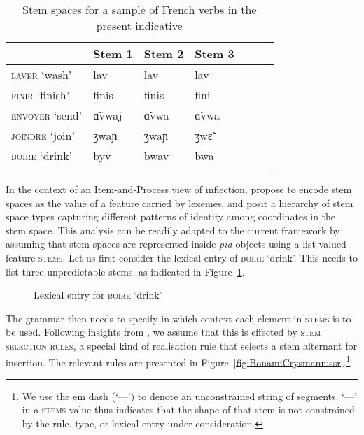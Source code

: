\documentclass[output=paper]{langsci/langscibook}
\begin{document}
\begin{table}[htb]

\begin{tabular}{lllllll}
\lsptoprule
& Stem 1 & Stem 2 & Stem 3\\
\midrule
\textsc{laver} `wash' & lav & lav & lav\\
\textsc{finir} `finish' & finis & finis & fini\\
\midrule
\textsc{envoyer} `send' & ɑ̃vwaj & ɑ̃vwa & ɑ̃vwa\\
\textsc{joindre} `join' & ʒwaɲ & ʒwaɲ& ʒwɛ̃\\
\textsc{boire} `drink' & byv & bwav & bwa\\
\lspbottomrule
\end{tabular}
\caption{Stem spaces for a sample of French verbs in the present indicative\label{tab:BonamiCrysmann:ss}}
\end{table}

\newpage 
In the context of an Item-and-Process view of inflection,
\citet{Bonami06} propose to encode stem spaces as the value of a
feature carried by lexemes, and posit a hierarchy of stem space types
capturing different patterns of identity among coordinates in the stem
space. This analysis can be readily adapted to the current framework by
assuming that stem spaces are represented inside \textit{pid} objects
using a list-valued feature \textsc{stems}. Let us first consider the
lexical entry of \textsc{boire} `drink'. This needs to list three
unpredictable stems, as indicated in Figure~\ref{fig:BonamiCrysmann:boire}.

\begin{figure}[htb]
\centering\smaller
{}
\caption{Lexical entry for \textsc{boire} `drink'\label{fig:BonamiCrysmann:boire}}
\end{figure}

The grammar then needs to specify in which context each element in
\textsc{stems} is to be used. Following insights from
\citet[chap.~6]{Stump01}, we assume that this is effected by
\textsc{stem selection rules}, a special kind of realisation rule that
selects a stem alternant for insertion. The relevant rules are
presented in Figure~\ref{fig:BonamiCrysmann:ssr}.\footnote{We use the em dash (`—')
  to denote an unconstrained string of segments. `—' in a
  \textsc{stems} value thus indicates that the shape of that stem is
  not constrained by the rule, type, or lexical entry under
  consideration.}
\end{document}
